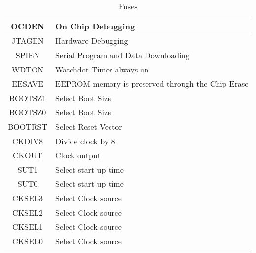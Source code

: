 \begin{longtable}{|c|l|} 
\caption{Fuses} \\
\hline
\label{tab:TD_VI-910}
OCDEN & On Chip Debugging \\ \hline 
JTAGEN & Hardware Debugging \\ \hline 
SPIEN & Serial Program and Data Downloading \\ \hline 
WDTON & Watchdot Timer always on \\ \hline 
EESAVE & EEPROM memory is preserved through the Chip Erase \\ \hline 
BOOTSZ1 & Select Boot Size \\ \hline 
BOOTSZ0 & Select Boot Size \\ \hline 
BOOTRST & Select Reset Vector \\ \hline 
CKDIV8 & Divide clock by 8 \\ \hline 
CKOUT & Clock output \\ \hline 
SUT1 & Select start-up time \\ \hline 
SUT0 & Select start-up time \\ \hline 
CKSEL3 & Select Clock source \\ \hline 
CKSEL2 & Select Clock source \\ \hline 
CKSEL1 & Select Clock source \\ \hline 
CKSEL0 & Select Clock source \\ \hline 
\end{longtable} 